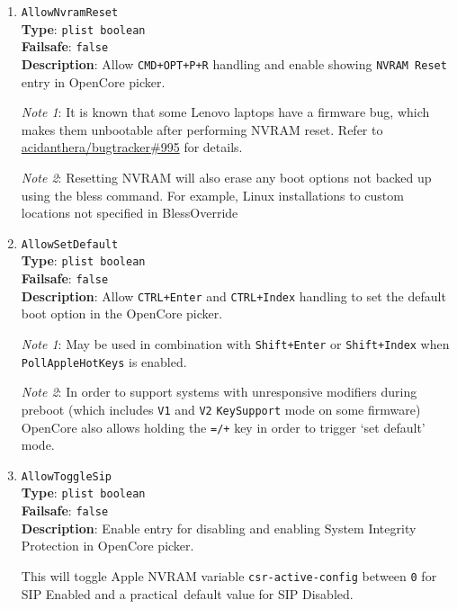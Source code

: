 \documentclass[]{article}
\begin{document}
\begin{enumerate}

\item
  \texttt{AllowNvramReset}\\
  \textbf{Type}: \texttt{plist\ boolean}\\
  \textbf{Failsafe}: \texttt{false}\\
  \textbf{Description}: Allow \texttt{CMD+OPT+P+R} handling and enable
  showing \texttt{NVRAM Reset} entry in OpenCore picker.

  \emph{Note 1}: It is known that some Lenovo laptops have a firmware
  bug, which makes them unbootable after performing NVRAM reset. Refer to
  \href{https://github.com/acidanthera/bugtracker/issues/995}{acidanthera/bugtracker\#995}
  for details.

  \emph{Note 2}: Resetting NVRAM will also erase any boot options not backed up using
  the bless command. For example, Linux installations to custom locations not specified
  in BlessOverride

\item
  \texttt{AllowSetDefault}\\
  \textbf{Type}: \texttt{plist\ boolean}\\
  \textbf{Failsafe}: \texttt{false}\\
  \textbf{Description}: Allow \texttt{CTRL+Enter} and \texttt{CTRL+Index} handling
  to set the default boot option in the OpenCore picker.

  \emph{Note 1}: May be used in combination
  with \texttt{Shift+Enter} or \texttt{Shift+Index} when \texttt{PollAppleHotKeys} is
  enabled.

  \emph{Note 2}: In order to support systems with unresponsive modifiers during preboot
  (which includes \texttt{V1} and \texttt{V2} \texttt{KeySupport} mode on some firmware)
  OpenCore also allows holding the \texttt{=/+} key in order to trigger `set default' mode.

\item
  \texttt{AllowToggleSip}\\
  \textbf{Type}: \texttt{plist\ boolean}\\
  \textbf{Failsafe}: \texttt{false}\\
  \textbf{Description}: Enable
  entry for disabling and enabling System Integrity Protection in OpenCore picker.

  This will toggle Apple NVRAM variable \texttt{csr-active-config} between \texttt{0} for
  SIP Enabled and a practical default value for SIP Disabled.


\end{enumerate}
\end{document}
